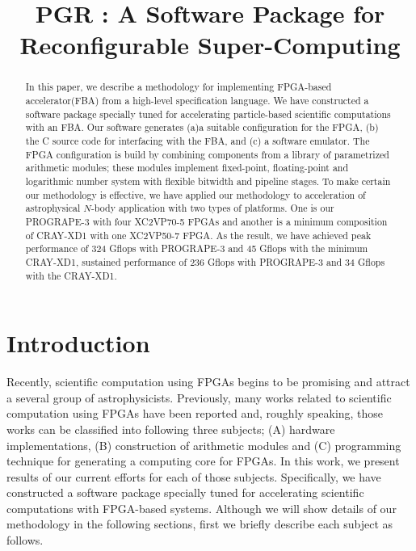 \documentclass{article}
\title{PGR : A Software Package for Reconfigurable Super-Computing}
\begin{document}
\maketitle




\begin{abstract}
In this paper, we describe a methodology for implementing FPGA-based
accelerator(FBA) from a high-level specification language.  We have
constructed a software package specially tuned for accelerating
particle-based scientific computations with an FBA.  Our software
generates (a)a suitable configuration for the FPGA, (b) the C source
code for interfacing with the FBA, and (c) a software emulator. The
FPGA configuration is build by combining components from a library of
parametrized arithmetic modules; these modules implement fixed-point,
floating-point and logarithmic number system with flexible bitwidth
and pipeline stages.  To make certain our methodology is effective, we
have applied our methodology to acceleration of astrophysical $N$-body
application with two types of platforms.  One is our PROGRAPE-3 with
four XC2VP70-5 FPGAs and another is a minimum composition of CRAY-XD1
with one XC2VP50-7 FPGA.
As the result, we have achieved peak performance of 324 Gflops with PROGRAPE-3
and 45 Gflops with the minimum CRAY-XD1, sustained performance of 236 Gflops with
PROGRAPE-3 and 34 Gflops with the CRAY-XD1. 
\end{abstract}



\section{Introduction}
\label{sec:intro}


Recently, scientific computation using FPGAs begins to be promising
and attract a several group of astrophysicists.
Previously, many works related to scientific computation using FPGAs
have been reported and, roughly speaking, 
those works can be classified into following three subjects;
(A) hardware implementations, (B) construction of arithmetic modules
and (C) programming technique for generating a
computing core for FPGAs. 
In this work, we present results of our current efforts for each of those subjects. 
Specifically, we have constructed a software package specially 
tuned for accelerating scientific computations with FPGA-based systems.
Although we will show details of our methodology in the following sections, 
first we briefly describe each subject as follows.
\end{document}
